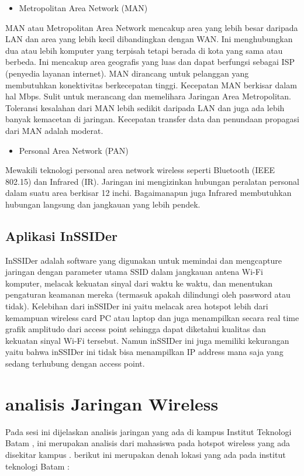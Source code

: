 \documentclass[conference]{IEEEtran}
\begin{document}
\begin{itemize}
    \item Metropolitan Area Network (MAN)
\end{itemize}
MAN atau Metropolitan Area Network mencakup area yang lebih besar daripada LAN dan area yang lebih kecil dibandingkan dengan WAN.
Ini menghubungkan dua atau lebih komputer yang terpisah tetapi berada di kota yang sama atau berbeda. 
Ini mencakup area geografis yang luas dan dapat berfungsi sebagai ISP (penyedia layanan internet).
MAN dirancang untuk pelanggan yang membutuhkan konektivitas berkecepatan tinggi.
Kecepatan MAN berkisar dalam hal Mbps. Sulit untuk merancang dan memelihara Jaringan Area Metropolitan. 
Toleransi kesalahan dari MAN lebih sedikit daripada LAN dan juga ada lebih banyak kemacetan di jaringan.
Kecepatan transfer data dan penundaan propagasi dari MAN adalah moderat.

\begin{itemize}
    \item Personal Area Network (PAN)
\end{itemize}
Mewakili teknologi personal area network wireless seperti Bluetooth (IEEE 802.15) dan Infrared (IR). 
Jaringan ini mengizinkan hubungan peralatan personal dalam suatu area berkisar 12 inchi. 
Bagaimanapun juga Infrared membutuhkan hubungan langsung dan jangkauan yang lebih pendek.~\cite{yudianto2014jaringan}

\subsection{Aplikasi InSSIDer}

InSSIDer adalah software yang digunakan untuk memindai dan mengcapture jaringan dengan parameter utama SSID dalam jangkauan antena Wi-Fi komputer, melacak kekuatan sinyal dari waktu ke waktu, dan menentukan pengaturan keamanan mereka (termasuk apakah dilindungi oleh password atau tidak).
Kelebihan dari inSSIDer ini yaitu melacak area hotspot lebih dari kemampuan wireless card PC atau laptop dan juga menampilkan secara real time grafik amplitudo dari access point sehingga dapat diketahui kualitas dan kekuatan sinyal Wi-Fi tersebut. Namun inSSIDer ini juga memiliki kekurangan yaitu bahwa inSSIDer ini tidak bisa menampilkan IP address mana saja yang sedang terhubung dengan access point.


\section{analisis Jaringan Wireless}
Pada sesi ini dijelaskan analisis jaringan yang ada di kampus Institut Teknologi Batam , ini merupakan analisis dari mahasiswa
pada hotspot wireless yang ada disekitar kampus . berikut ini merupakan denah lokasi yang ada pada institut teknologi Batam :
\end{document}
